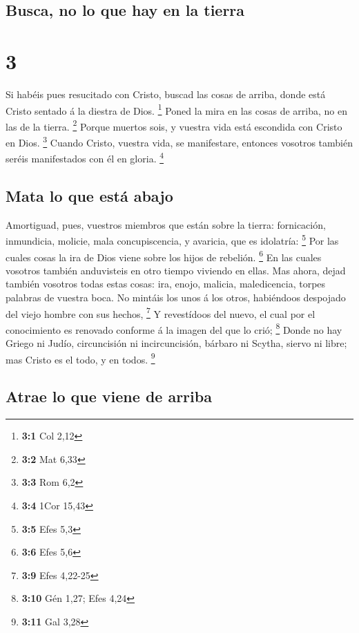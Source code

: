 \hypertarget{busca-no-lo-que-hay-en-la-tierra}{%
\subsection{Busca, no lo que hay en la
tierra}\label{busca-no-lo-que-hay-en-la-tierra}}

\hypertarget{section-2}{%
\section{3}\label{section-2}}

 Si habéis pues resucitado con Cristo, buscad las cosas de
arriba, donde está Cristo sentado á la diestra de Dios. \footnote{\textbf{3:1}
  Col 2,12}  Poned la mira en las cosas de arriba, no en
las de la tierra. \footnote{\textbf{3:2} Mat 6,33}  Porque
muertos sois, y vuestra vida está escondida con Cristo en Dios.
\footnote{\textbf{3:3} Rom 6,2}  Cuando Cristo, vuestra
vida, se manifestare, entonces vosotros también seréis manifestados con
él en gloria. \footnote{\textbf{3:4} 1Cor 15,43}

\hypertarget{mata-lo-que-estuxe1-abajo}{%
\subsection{Mata lo que está abajo}\label{mata-lo-que-estuxe1-abajo}}

 Amortiguad, pues, vuestros miembros que están sobre la
tierra: fornicación, inmundicia, molicie, mala concupiscencia, y
avaricia, que es idolatría: \footnote{\textbf{3:5} Efes 5,3}
 Por las cuales cosas la ira de Dios viene sobre los hijos
de rebelión. \footnote{\textbf{3:6} Efes 5,6}  En las
cuales vosotros también anduvisteis en otro tiempo viviendo en ellas.
 Mas ahora, dejad también vosotros todas estas cosas: ira,
enojo, malicia, maledicencia, torpes palabras de vuestra boca.
 No mintáis los unos á los otros, habiéndoos despojado del
viejo hombre con sus hechos, \footnote{\textbf{3:9} Efes 4,22-25}
 Y revestídoos del nuevo, el cual por el conocimiento es
renovado conforme á la imagen del que lo crió; \footnote{\textbf{3:10}
  Gén 1,27; Efes 4,24}  Donde no hay Griego ni Judío,
circuncisión ni incircuncisión, bárbaro ni Scytha, siervo ni libre; mas
Cristo es el todo, y en todos. \footnote{\textbf{3:11} Gal 3,28}

\hypertarget{atrae-lo-que-viene-de-arriba}{%
\subsection{Atrae lo que viene de
arriba}\label{atrae-lo-que-viene-de-arriba}}

